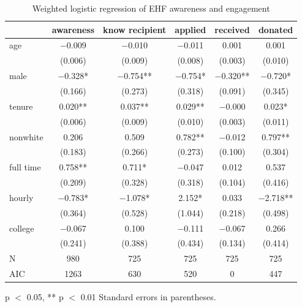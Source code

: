 \documentclass[
  11pt,
  oneside]{article}
\begin{document}
\begin{table}
\centering
\caption{\label{tab:ACNT-aware-calcs}Weighted logistic regression of EHF awareness and engagement \label{tab:awareness-model-wmt}}
\centering
\begin{threeparttable}
\begin{tabular}[t]{lccccc}
\toprule
  & awareness & know recipient & applied & received & donated\\
\midrule
age & \num{-0.009} & \num{-0.010} & \num{-0.011} & \num{0.001} & \num{0.001}\\
 & (\num{0.006}) & (\num{0.009}) & (\num{0.008}) & (\num{0.003}) & (\num{0.010})\\
male & \num{-0.328}* & \num{-0.754}** & \num{-0.754}* & \num{-0.320}** & \num{-0.720}*\\
 & (\num{0.166}) & (\num{0.273}) & (\num{0.318}) & (\num{0.091}) & (\num{0.345})\\
tenure & \num{0.020}** & \num{0.037}** & \num{0.029}** & \num{-0.000} & \num{0.023}*\\
 & (\num{0.006}) & (\num{0.009}) & (\num{0.010}) & (\num{0.003}) & (\num{0.011})\\
nonwhite & \num{0.206} & \num{0.509} & \num{0.782}** & \num{-0.012} & \num{0.797}**\\
 & (\num{0.183}) & (\num{0.266}) & (\num{0.273}) & (\num{0.100}) & (\num{0.304})\\
full time & \num{0.758}** & \num{0.711}* & \num{-0.047} & \num{0.012} & \num{0.537}\\
 & (\num{0.209}) & (\num{0.328}) & (\num{0.318}) & (\num{0.104}) & (\num{0.416})\\
hourly & \num{-0.783}* & \num{-1.078}* & \num{2.152}* & \num{0.033} & \num{-2.718}**\\
 & (\num{0.364}) & (\num{0.528}) & (\num{1.044}) & (\num{0.218}) & (\num{0.498})\\
college & \num{-0.067} & \num{0.100} & \num{-0.111} & \num{-0.067} & \num{0.266}\\
 & (\num{0.241}) & (\num{0.388}) & (\num{0.434}) & (\num{0.134}) & (\num{0.414})\\
\midrule
N & \num{980} & \num{725} & \num{725} & \num{725} & \num{725}\\
AIC & \num{1263} & \num{630} & \num{520} & \num{0} & \num{447}\\
\bottomrule
\end{tabular}
\begin{tablenotes}
\item * p $<$ 0.05, ** p $<$ 0.01 Standard errors in parentheses.
\end{tablenotes}
\end{threeparttable}
\end{table}
\end{document}
